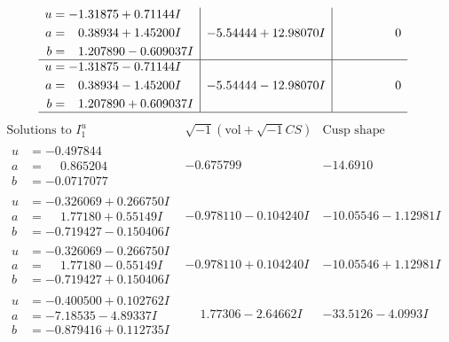 \documentclass[1p]{elsarticle_modified}
\theoremstyle{definition}
\newcommand{\I}{\sqrt{-1}}
\begin{document}
$$\begin{array}{c|c|c}
\begin{aligned}
u &= -1.31875 + 0.71144 I \\
a &= \phantom{-}0.38934 + 1.45200 I \\
b &= \phantom{-}1.207890 - 0.609037 I\end{aligned}
 & -5.54444 + 12.98070 I & \phantom{-0.000000 } 0 \\ \hline\begin{aligned}
u &= -1.31875 - 0.71144 I \\
a &= \phantom{-}0.38934 - 1.45200 I \\
b &= \phantom{-}1.207890 + 0.609037 I\end{aligned}
 & -5.54444 - 12.98070 I & \phantom{-0.000000 } 0\\
 \hline 
 \end{array}$$\newpage$$\begin{array}{c|c|c}  
\text{Solutions to }I^u_{1}& \I (\text{vol} + \sqrt{-1}CS) & \text{Cusp shape}\\
 \hline 
\begin{aligned}
u &= -0.497844\phantom{ +0.000000I} \\
a &= \phantom{-}0.865204\phantom{ +0.000000I} \\
b &= -0.0717077\phantom{ +0.000000I}\end{aligned}
 & -0.675799\phantom{ +0.000000I} & -14.6910\phantom{ +0.000000I} \\ \hline\begin{aligned}
u &= -0.326069 + 0.266750 I \\
a &= \phantom{-}1.77180 + 0.55149 I \\
b &= -0.719427 - 0.150406 I\end{aligned}
 & -0.978110 - 0.104240 I & -10.05546 - 1.12981 I \\ \hline\begin{aligned}
u &= -0.326069 - 0.266750 I \\
a &= \phantom{-}1.77180 - 0.55149 I \\
b &= -0.719427 + 0.150406 I\end{aligned}
 & -0.978110 + 0.104240 I & -10.05546 + 1.12981 I \\ \hline\begin{aligned}
u &= -0.400500 + 0.102762 I \\
a &= -7.18535 - 4.89337 I \\
b &= -0.879416 + 0.112735 I\end{aligned}
 & \phantom{-}1.77306 - 2.64662 I & -33.5126 - 4.0993 I \\ \hline\begin{aligned}

\end{aligned}
\end{array}$$
\end{document}
